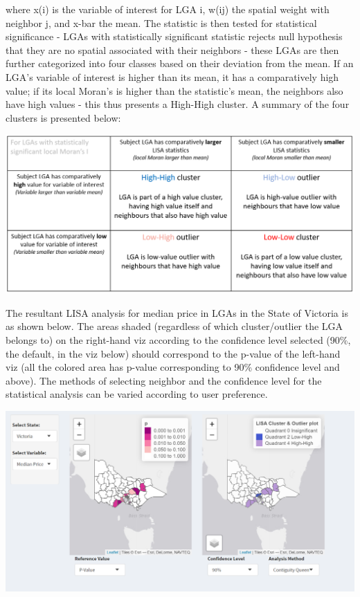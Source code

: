 \documentclass{acm_proc_article-sp}
\begin{document}
where x(i) is the variable of interest for LGA i, w(ij) the spatial
weight with neighbor j, and x-bar the mean. The statistic is then tested
for statistical significance - LGAs with statistically significant
statistic rejects null hypothesis that they are no spatial associated
with their neighbors - these LGAs are then further categorized into four
classes based on their deviation from the mean. If an LGA's variable of
interest is higher than its mean, it has a comparatively high value; if
its local Moran's is higher than the statistic's mean, the neighbors
also have high values - this thus presents a High-High cluster. A
summary of the four clusters is presented below:

\includegraphics{images/lminterpret.png}

The resultant LISA analysis for median price in LGAs in the State of
Victoria is as shown below. The areas shaded (regardless of which
cluster/outlier the LGA belongs to) on the right-hand viz according to
the confidence level selected (90\%, the default, in the viz below)
should correspond to the p-value of the left-hand viz (all the colored
area has p-value corresponding to 90\% confidence level and above). The
methods of selecting neighbor and the confidence level for the
statistical analysis can be varied according to user preference.

\includegraphics{images/geo2.png}
\end{document}
